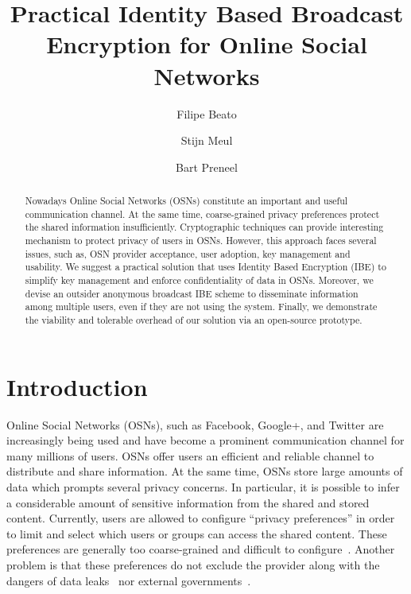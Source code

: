 \documentclass{llncs}
\begin{document}
\title{Practical Identity Based Broadcast Encryption for Online Social Networks}

\author{Filipe Beato \and Stijn Meul \and Bart Preneel}

\maketitle   %

\begin{abstract} Nowadays Online Social Networks (OSNs) constitute an important and useful communication channel. At the same time, coarse-grained privacy preferences protect the shared information insufficiently. Cryptographic techniques can provide interesting mechanism to protect privacy of users in OSNs. However, this approach faces several issues, such as, OSN provider acceptance, user adoption, key management and usability. We suggest a practical solution that uses Identity Based Encryption (IBE) to simplify key management and enforce confidentiality of data in OSNs. Moreover, we devise an outsider anonymous broadcast IBE scheme to disseminate information among multiple users, even if they are not using the system. Finally, we demonstrate the viability and tolerable overhead of our solution via an open-source prototype.
\end{abstract}


\section{Introduction}

Online Social Networks (OSNs), such as Facebook, Google+, and Twitter are increasingly being used and have become a prominent communication channel for many millions of users. OSNs offer users an efficient and reliable channel to distribute and share information. At the same time, OSNs store large amounts of data which prompts several privacy concerns. In particular, it is possible to infer a considerable amount of sensitive information from the shared and stored content. Currently, users are allowed to configure ``privacy preferences'' in order to limit and select which users or groups can access the shared content. These preferences are generally too coarse-grained and difficult to configure~\cite{bonneau2010privacy}. Another problem is that these preferences do not exclude the provider along with the dangers of data leaks~\cite{fischetti11hacker} nor external governments~\cite{prism}.
\end{document}

